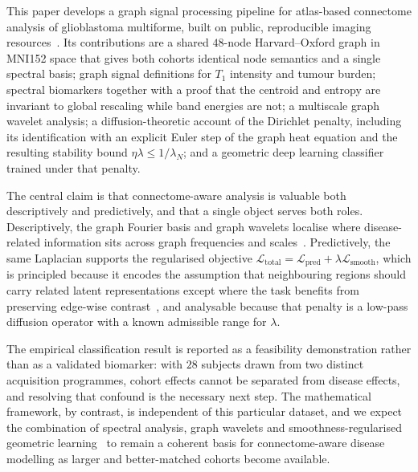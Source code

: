 \documentclass[11pt,reqno]{amsart}
\theoremstyle{plain}
\theoremstyle{definition}
\theoremstyle{remark}
\numberwithin{equation}{section}
\newcommand{\Lpred}{\mathcal{L}_{\mathrm{pred}}}
\newcommand{\Lsmooth}{\mathcal{L}_{\mathrm{smooth}}}
\newcommand{\Ltotal}{\mathcal{L}_{\mathrm{total}}}
\begin{document}
This paper develops a graph signal processing pipeline for atlas-based
connectome analysis of glioblastoma multiforme, built on public, reproducible
imaging resources~\cite{ixi_dataset,bakas2022university,upenngbm_tcia}. Its
contributions are a shared $48$-node Harvard--Oxford graph in MNI152 space that
gives both cohorts identical node semantics and a single spectral basis; graph
signal definitions for $T_1$ intensity and tumour burden; spectral biomarkers
together with a proof that the centroid and entropy are invariant to global
rescaling while band energies are not; a multiscale graph wavelet analysis;
a diffusion-theoretic account of the Dirichlet penalty, including its
identification with an explicit Euler step of the graph heat equation and the
resulting stability bound $\eta\lambda\le1/\lambda_N$; and a geometric deep
learning classifier trained under that penalty.

The central claim is that connectome-aware analysis is valuable both
descriptively and predictively, and that a single object serves both roles.
Descriptively, the graph Fourier basis and graph wavelets localise where
disease-related information sits across graph frequencies and
scales~\cite{shuman2013emerging,hammond2011wavelets,huang2018graph}.
Predictively, the same Laplacian supports the regularised objective
$\Ltotal = \Lpred + \lambda\Lsmooth$, which is principled because it encodes the
assumption that neighbouring regions should carry related latent representations
except where the task benefits from preserving edge-wise
contrast~\cite{zhou2004learning,belkin2003laplacian}, and analysable because
that penalty is a low-pass diffusion operator with a known admissible range for
$\lambda$.

The empirical classification result is reported as a feasibility demonstration
rather than as a validated biomarker: with $28$ subjects drawn from two distinct
acquisition programmes, cohort effects cannot be separated from disease effects,
and resolving that confound is the necessary next step. The mathematical
framework, by contrast, is independent of this particular dataset, and we expect
the combination of spectral analysis, graph wavelets and smoothness-regularised
geometric learning~\cite{bronstein2017geometric,bronstein2021geometric} to
remain a coherent basis for connectome-aware disease modelling as larger and
better-matched cohorts become available.

\end{document}
